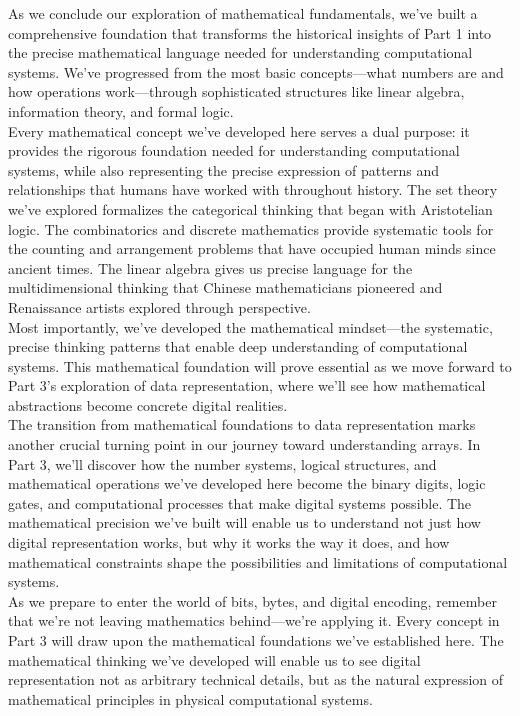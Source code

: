 \documentclass[12pt, oneside, openany]{book}
\begin{document}
As we conclude our exploration of mathematical fundamentals, we've built a comprehensive foundation that transforms the historical insights of Part 1 into the precise mathematical language needed for understanding computational systems. We've progressed from the most basic concepts—what numbers are and how operations work—through sophisticated structures like linear algebra, information theory, and formal logic.\\
Every mathematical concept we've developed here serves a dual purpose: it provides the rigorous foundation needed for understanding computational systems, while also representing the precise expression of patterns and relationships that humans have worked with throughout history. The set theory we've explored formalizes the categorical thinking that began with Aristotelian logic. The combinatorics and discrete mathematics provide systematic tools for the counting and arrangement problems that have occupied human minds since ancient times. The linear algebra gives us precise language for the multidimensional thinking that Chinese mathematicians pioneered and Renaissance artists explored through perspective.\\
Most importantly, we've developed the mathematical mindset—the systematic, precise thinking patterns that enable deep understanding of computational systems. This mathematical foundation will prove essential as we move forward to Part 3's exploration of data representation, where we'll see how mathematical abstractions become concrete digital realities.\\
The transition from mathematical foundations to data representation marks another crucial turning point in our journey toward understanding arrays. In Part 3, we'll discover how the number systems, logical structures, and mathematical operations we've developed here become the binary digits, logic gates, and computational processes that make digital systems possible. The mathematical precision we've built will enable us to understand not just how digital representation works, but why it works the way it does, and how mathematical constraints shape the possibilities and limitations of computational systems.\\
As we prepare to enter the world of bits, bytes, and digital encoding, remember that we're not leaving mathematics behind—we're applying it. Every concept in Part 3 will draw upon the mathematical foundations we've established here. The mathematical thinking we've developed will enable us to see digital representation not as arbitrary technical details, but as the natural expression of mathematical principles in physical computational systems.
\end{document}
